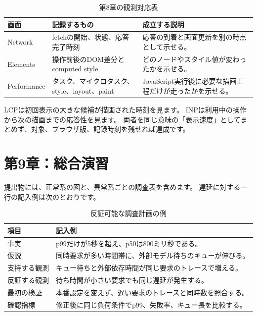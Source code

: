 \begin{table}[htbp]
  \par
  \centering
  \caption{第8章の観測対応表}
  \begin{tabularx}{\textwidth}{@{}p{}p{}X@{}}
    \toprule
    画面 & 記録するもの & 成立する説明 \\
    \midrule
    Network & fetchの開始、状態、応答完了時刻 & 応答の到着と画面更新を別の時点として示せる。 \\
    Elements & 操作前後のDOM差分とcomputed style & どのノードやスタイル値が変わったかを示せる。 \\
    Performance & タスク、マイクロタスク、style、layout、paint & JavaScript実行後に必要な描画工程だけが走ったかを示せる。 \\
    \bottomrule
  \end{tabularx}
\end{table}

LCPは初回表示の大きな候補が描画された時刻を見ます。
INPは利用中の操作から次の描画までの応答性を見ます。
両者を同じ意味の「表示速度」としてまとめず、対象、ブラウザ版、記録時刻を残せれば達成です。

\section{第9章：総合演習}

提出物には、正常系の図と、異常系ごとの調査表を含めます。
遅延に対する一行の記入例は次のとおりです。

\begin{table}[htbp]
  \par
  \centering
  \caption{反証可能な調査計画の例}
  \begin{tabularx}{\textwidth}{@{}p{}X@{}}
    \toprule
    項目 & 記入例 \\
    \midrule
    事実 & p99だけが5秒を超え、p50は800ミリ秒である。 \\
    仮説 & 同時要求が多い時間帯に、外部モデル待ちのキューが伸びる。 \\
    支持する観測 & キュー待ちと外部依存時間が同じ要求のトレースで増える。 \\
    反証する観測 & 待ち時間が小さい要求でも同じ遅延が発生する。 \\
    最初の検証 & 本番設定を変えず、遅い要求のトレースと同時数を照合する。 \\
    確認指標 & 修正後に同じ負荷条件でp99、失敗率、キュー長を比較する。 \\
    \bottomrule
  \end{tabularx}
\end{table}

